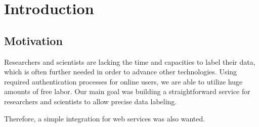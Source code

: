 \section{Introduction}
\label{sec:intro}


\subsection{Motivation}
Researchers and scientists are lacking the time and capacities to label their data, which is often further needed in order to advance other technologies. Using required authentication processes for online users, we are able to utilize huge amounts of free labor. Our main goal was building a straightforward service for researchers and scientists to allow precise data labeling.

Therefore, a simple integration for web services was also wanted.

\clearpage
